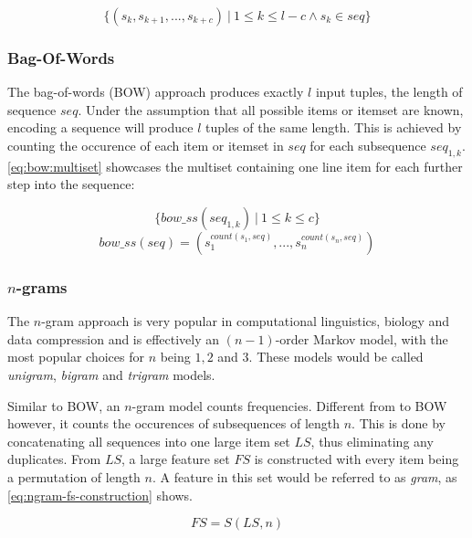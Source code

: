 \begin{equation}
    \label{eq:sliding-window:tuple-set}
    \{ (s_k, s_{k+1}, ..., s_{k+c})\ |\ 1 \leq k \leq l-c \wedge s_k \in seq \}
\end{equation}

\subsubsection*{Bag-Of-Words}
The bag-of-words (BOW) approach produces exactly $l$ input tuples, the length of sequence $seq$. Under the assumption that all possible items or itemset are known, encoding a sequence will produce $l$ tuples of the same length. This is achieved by counting the occurence of each item or itemset in $seq$ for each subsequence $seq_{1,k}$. \autoref{eq:bow:multiset} showcases the multiset containing one line item for each further step into the sequence:

\begin{equation}
    \label{eq:bow:multiset}
    \{ bow\_ss(seq_{1,k})\ |\ 1 \leq k \leq c \}
\end{equation}
\begin{equation}
    bow\_ss(seq) = ( s_1^{count(s_1,seq)}, ..., s_n^{count(s_n,seq)} )
\end{equation}

\subsubsection*{$n$-grams}
The $n$-gram approach is very popular in computational linguistics, biology and data compression and is effectively an $(n-1)$-order Markov model, with the most popular choices for $n$ being $1,2$ and $3$. These models would be called \textit{unigram}, \textit{bigram} and \textit{trigram} models.

Similar to BOW, an $n$-gram model counts frequencies. Different from to BOW however, it counts the occurences of subsequences of length $n$. This is done by concatenating all sequences into one large item set $LS$, thus eliminating any duplicates. From $LS$, a large feature set $FS$ is constructed with every item being a permutation of length $n$. A feature in this set would be referred to as \textit{gram}, as \autoref{eq:ngram-fs-construction} shows.

\begin{equation}\label{eq:ngram-fs-construction}
    FS = S(LS, n)
\end{equation}

